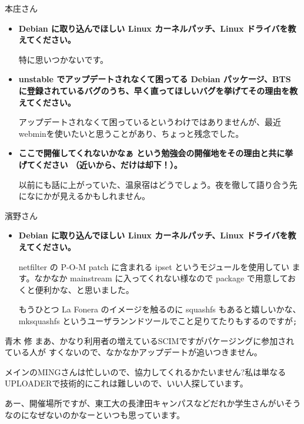 \documentclass[cjk,dvipdfmx,12pt]{beamer}
\begin{document}
\begin{frame}{本庄さん}
\begin{itemize}
\item {\bf Debian に取り込んでほしい Linux カーネルパッチ、Linux ドライバを教えてください。}

特に思いつかないです。

\item {\bf unstable でアップデートされなくて困ってる Debian パッケージ、BTS に登録されているバグのうち、早く直ってほしいバグを挙げてその理由を教えてください。}

アップデートされなくて困っているというわけではありませんが、最近
webminを使いたいと思うことがあり、ちょっと残念でした。

\item {\bf ここで開催してくれないかなぁ という勉強会の開催地をその理由と共に挙げてください （近いから、だけは却下！）。}

以前にも話に上がっていた、温泉宿はどうでしょう。夜を徹して語り合う先になにかが見えるかもしれません。
\end{itemize}
\end{frame}

\begin{frame}{濱野さん}
\begin{itemize}
\item {\bf Debian に取り込んでほしい Linux カーネルパッチ、Linux ドライバを教えてください。}

netfilter の P-O-M patch に含まれる ipset というモジュールを使用してい
ます。なかなか mainstream に入ってくれない様なので package で用意してお
くと便利かな、と思いました。

もうひとつ La Fonera のイメージを触るのに squashfs もあると嬉しいかな、
mksquashfs というユーザランンドツールでこと足りてたりもするのですが\tt{}\tt{};
\end{itemize}
\end{frame}

\begin{frame}{青木 修}
まあ、かなり利用者の増えているSCIMですがパケージングに参加されている人が
すくないので、なかなかアップデートが追いつきません。

メインのMINGさんは忙しいので、協力してくれるかたいません?私は単なる
UPLOADERで技術的にこれは難しいので、いい人探しています。

あー、開催場所ですが、東工大の長津田キャンパスなどだれか学生さんがいそう
なのになぜないのかなーといつも思っています。
\end{frame}
\end{document}
